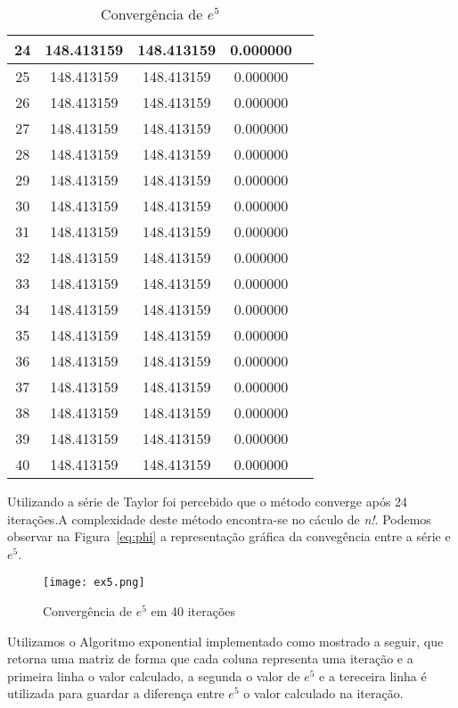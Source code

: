 \begin{table}[H]
\begin{tabular}{|c|c|c|c|c|}
				\hline
				24 & 148.413159 & 148.413159 & 0.000000\\
				\hline
				25 & 148.413159 & 148.413159 & 0.000000\\
				\hline
				26 & 148.413159 & 148.413159 & 0.000000\\
				\hline
				27 & 148.413159 & 148.413159 & 0.000000\\
				\hline
				28 & 148.413159 & 148.413159 & 0.000000\\
				\hline
				29 & 148.413159 & 148.413159 & 0.000000\\
				\hline
				30 & 148.413159 & 148.413159 & 0.000000\\
				\hline
				31 & 148.413159 & 148.413159 & 0.000000\\
				\hline
				32 & 148.413159 & 148.413159 & 0.000000\\
				\hline
				33 & 148.413159 & 148.413159 & 0.000000\\
				\hline
				34 & 148.413159 & 148.413159 & 0.000000\\
				\hline
				35 & 148.413159 & 148.413159 & 0.000000\\
				\hline
				36 & 148.413159 & 148.413159 & 0.000000\\
				\hline
				37 & 148.413159 & 148.413159 & 0.000000\\
				\hline
				38 & 148.413159 & 148.413159 & 0.000000\\
				\hline
				39 & 148.413159 & 148.413159 & 0.000000\\
				\hline
				40 & 148.413159 & 148.413159 & 0.000000\\
				\hline
			\end{tabular}
			\label{ex_table}
			\caption{Convergência de $e^5$}
		\end{table}

		Utilizando a série de Taylor foi percebido que o método converge após 24
		iterações.A complexidade deste método encontra-se no cáculo de
		\emph{n!}.  Podemos observar na Figura~\ref{eq:phi} a representação
		gráfica da convegência entre a série e $e^5$. 

		\begin{figure}[H] \centering
			\texttt{[image: ex5.png]} 
		\caption{Convergência de $e^5$ em 40 iterações}
		\label{ex5} 
		\end{figure}

		Utilizamos o Algoritmo exponential implementado como mostrado a seguir,
		que retorna uma matriz de forma que cada coluna representa uma iteração
		e a primeira linha o valor calculado, a segunda o valor de $e^5$ e a
		tereceira linha é utilizada para guardar a diferença entre $e^5$ o valor
		calculado na iteração.

